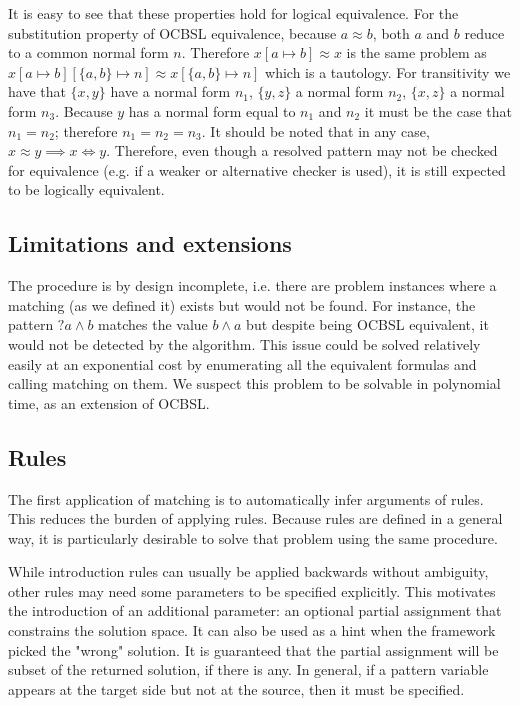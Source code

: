 It is easy to see that these properties hold for logical equivalence. For the substitution property of OCBSL equivalence, because $a \approx b$, both $a$ and $b$ reduce to a common normal form $n$. Therefore $x[a \mapsto b] \approx x$ is the same problem as $x[a \mapsto b][\{a, b\} \mapsto n] \approx x[\{a, b\} \mapsto n]$ which is a tautology. For transitivity we have that $\{x, y\}$ have a normal form $n_1$, $\{y, z\}$ a normal form $n_2$, $\{x, z\}$ a normal form $n_3$. Because $y$ has a normal form equal to $n_1$ and $n_2$ it must be the case that $n_1 = n_2$; therefore $n_1 = n_2 = n_3$.
It should be noted that in any case, $x \approx y \implies x \Leftrightarrow y$. Therefore, even though a resolved pattern may not be checked for equivalence (e.g. if a weaker or alternative checker is used), it is still expected to be logically equivalent.

\subsection{Limitations and extensions}

The procedure is by design incomplete, i.e. there are problem instances where a matching (as we defined it) exists but would not be found. For instance, the pattern ${?a} \land b$ matches the value $b \land a$ but despite being OCBSL equivalent, it would not be detected by the algorithm. This issue could be solved relatively easily at an exponential cost by enumerating all the equivalent formulas and calling matching on them. We suspect this problem to be solvable in polynomial time, as an extension of OCBSL.

\subsection{Rules}

The first application of matching is to automatically infer arguments of rules. This reduces the burden of applying rules. Because rules are defined in a general way, it is particularly desirable to solve that problem using the same procedure.

While introduction rules can usually be applied backwards without ambiguity, other rules may need some parameters to be specified explicitly. This motivates the introduction of an additional parameter: an optional partial assignment that constrains the solution space. It can also be used as a hint when the framework picked the "wrong" solution. It is guaranteed that the partial assignment will be subset of the returned solution, if there is any. In general, if a pattern variable appears at the target side but not at the source, then it must be specified.
